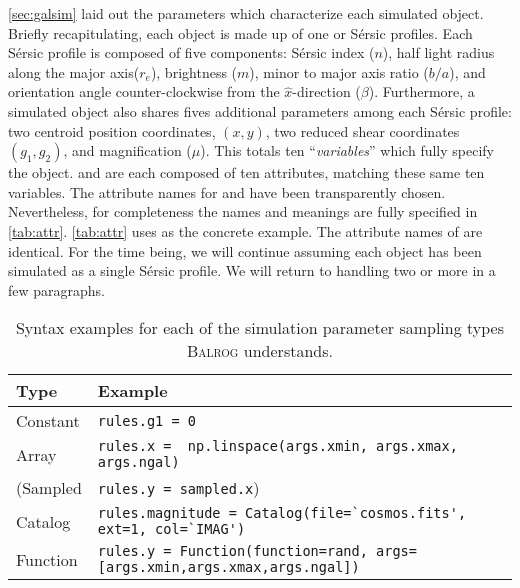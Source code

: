 \documentclass[11pt]{book}
\newcommand{\codett}[1]{\lstinline{#1}}
\newcommand{\balrog}{\textsc{Balrog}}
\newcommand{\sersic}{S\'{e}rsic}
\begin{document}
\autoref{sec:galsim} laid out the parameters which characterize each simulated object.
Briefly recapitulating, each object is made up of one or \sersic{} profiles.
Each \sersic{} profile is composed of five components: 
\sersic{} index ($n$), half light radius along the major axis($r_e$), brightness ($m$), minor to major axis ratio ($b/a$), 
and orientation angle counter-clockwise from the $\hat{x}$-direction ($\beta$).
Furthermore, a simulated object also shares fives additional parameters among each \sersic{} profile:
two centroid position coordinates, $(x,y)$, two reduced shear coordinates $(g_1,g_2)$, and magnification ($\mu$).
This totals ten ``\emph{variables}'' which fully specify the object.
\simrules{} and \simsamp{} are each composed of ten attributes,
matching these same ten variables.
The attribute names for \simrules{} and \simsamp{} have been transparently chosen.
Nevertheless, for completeness the names and meanings are fully specified in \autoref{tab:attr}.
\autoref{tab:attr} uses \simrules{} as the concrete example.
The attribute names of \simsamp{} are identical. 
For the time being, we will continue assuming each object has been simulated as a single \sersic{} profile.
We will return to handling two or more in a few paragraphs.

\begin{table} 
\caption{Syntax examples for each of the simulation parameter sampling types \balrog{} understands.} \label{tab:simtype}
\begin{tabular} {l l}
\toprule %
\rowcolor{gray2} \textbf{Type} & \textbf{Example} \\ \midrule
Constant & \codett{rules.g1 = 0} \\
Array & \codett{rules.x =  np.linspace(args.xmin, args.xmax, args.ngal)} \\
(Sampled  & \codett{rules.y = sampled.x}) \\
Catalog & \codett{rules.magnitude = Catalog(file=`cosmos.fits', ext=1, col=`IMAG')} \\
Function & \codett{rules.y = Function(function=rand, args=[args.xmin,args.xmax,args.ngal])} \\ \bottomrule %
\end{tabular}
\end{table}
\end{document}
